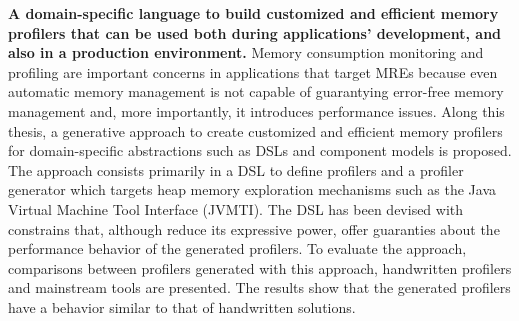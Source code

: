 \textbf{A domain-specific language to build customized and efficient memory profilers that can be used both during applications' development, and also in a production environment.}
Memory consumption monitoring and profiling are important concerns in applications that target MREs because even automatic memory management is not capable of guarantying error-free memory management and, more importantly, it introduces performance issues.
Along this thesis, a generative approach to create customized and efficient memory profilers for domain-specific abstractions such as DSLs and component models is proposed.
The approach consists primarily in a DSL to define profilers and a profiler generator which targets heap memory exploration mechanisms such as the Java Virtual Machine Tool Interface (JVMTI).
The DSL has been devised with constrains that, although reduce its expressive power, offer guaranties about the performance behavior of the generated profilers.
To evaluate the approach, comparisons between profilers generated with this approach, handwritten profilers and mainstream tools are presented.
The results show that the generated profilers have a behavior similar to that of handwritten solutions.


\begin{comment}


\section{Structure of the thesis}

\end{comment}
